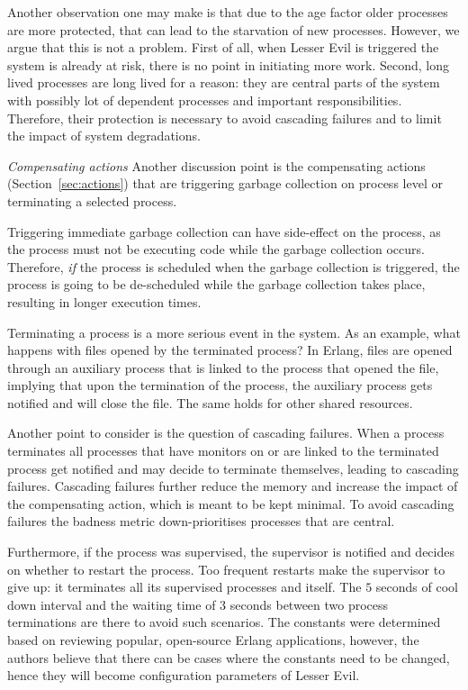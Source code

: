 \documentclass{llncs}
\begin{document}
Another observation one may make is that due to the age factor older processes are more protected, that can lead to the starvation of new processes. However, we argue that this is not a problem. First of all, when Lesser Evil is triggered the system is already at risk, there is no point in initiating more work. Second, long lived processes are long lived for a reason: they are central parts of the system with possibly lot of dependent processes and important responsibilities. Therefore, their protection is necessary to avoid cascading failures and to limit the impact of system degradations. 

\emph{Compensating actions} Another discussion point is the compensating actions (Section~\ref{sec:actions}) that are triggering garbage collection on process level or terminating a selected process.

Triggering immediate garbage collection can have side-effect on the process, as the process must not be executing code while the garbage collection occurs. Therefore, \emph{if} the process is scheduled when the garbage collection is triggered, the process is going to be de-scheduled while the garbage collection takes place, resulting in longer execution times.

Terminating a process is a more serious event in the system. As an example, what happens with files  opened by the terminated process? In Erlang, files are opened through an auxiliary process that is linked to the process that opened the file, implying that upon the termination of the process, the auxiliary process gets notified and will close the file.  The same holds for other shared resources.

Another point to consider is the question of cascading failures. When a process terminates all processes that have monitors on or are linked to the terminated process get notified and may decide to terminate themselves, leading to cascading failures. Cascading failures further reduce the memory and increase the impact of the compensating action, which is meant to be kept minimal. To avoid cascading failures the badness metric down-prioritises processes that are central. 

Furthermore, if the process was supervised, the supervisor is notified and decides on whether to restart the process. Too frequent restarts make the supervisor to give up: it terminates all its supervised processes and itself. The $5$ seconds of cool down interval and the waiting time of $3$ seconds between two process terminations are there to avoid such scenarios. The constants were determined based on reviewing popular, open-source Erlang applications, however, the authors believe that there can be cases where the constants need to be changed, hence they will become configuration parameters of Lesser Evil. 
\end{document}
